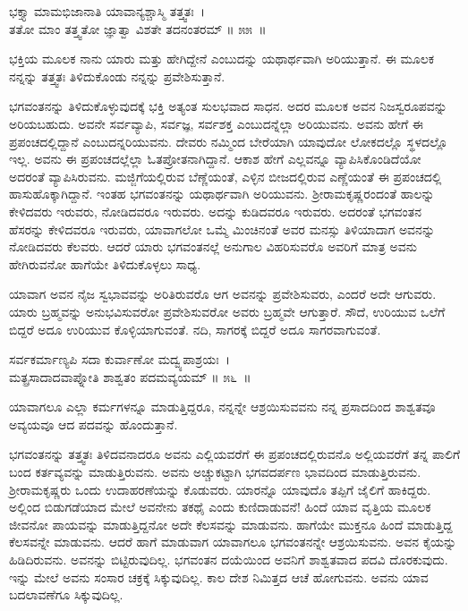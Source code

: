 \begin{shloka}
ಭಕ್ತ್ಯಾ ಮಾಮಭಿಜಾನಾತಿ ಯಾವಾನ್ಯಶ್ಚಾಸ್ಮಿ ತತ್ತ್ವತಃ~।\\ತತೋ ಮಾಂ ತತ್ತ್ವತೋ ಜ್ಞಾತ್ವಾ ವಿಶತೇ ತದನಂತರಮ್ \hfill॥ ೫೫~॥
\end{shloka}

\begin{artha}
ಭಕ್ತಿಯ ಮೂಲಕ ನಾನು ಯಾರು ಮತ್ತು ಹೇಗಿದ್ದೇನೆ ಎಂಬುದನ್ನು ಯಥಾರ್ಥವಾಗಿ ಅರಿಯುತ್ತಾನೆ. ಈ ಮೂಲಕ ನನ್ನನ್ನು ತತ್ತ್ವತಃ ತಿಳಿದುಕೊಂಡು ನನ್ನನ್ನು ಪ್ರವೇಶಿಸುತ್ತಾನೆ.
\end{artha}

ಭಗವಂತನನ್ನು ತಿಳಿದುಕೊಳ್ಳುವುದಕ್ಕೆ ಭಕ್ತಿ ಅತ್ಯಂತ ಸುಲಭವಾದ ಸಾಧನ. ಅದರ ಮೂಲಕ ಅವನ ನಿಜಸ್ವರೂಪವನ್ನು ಅರಿಯಬಹುದು. ಅವನೇ ಸರ್ವವ್ಯಾಪಿ, ಸರ್ವಜ್ಞ, ಸರ್ವಶಕ್ತ ಎಂಬುದನ್ನೆಲ್ಲಾ ಅರಿಯುವನು. ಅವನು ಹೇಗೆ ಈ ಪ್ರಪಂಚದಲ್ಲಿದ್ದಾನೆ ಎಂಬುದನ್ನರಿಯುವನು. ದೇವರು ನಮ್ಮಿಂದ ಬೇರೆಯಾಗಿ ಯಾವುದೋ ಲೋಕದಲ್ಲೊ ಸ್ಥಳದಲ್ಲೊ ಇಲ್ಲ. ಅವನು ಈ ಪ್ರಪಂಚದಲ್ಲೆಲ್ಲಾ ಓತಪ್ರೋತನಾಗಿದ್ದಾನೆ. ಆಕಾಶ ಹೇಗೆ ಎಲ್ಲವನ್ನೂ ವ್ಯಾಪಿಸಿಕೊಂಡಿದೆಯೋ ಅದರಂತೆ ವ್ಯಾಪಿಸಿರುವನು. ಮಜ್ಜಿಗೆಯಲ್ಲಿರುವ ಬೆಣ್ಣೆಯಂತೆ, ಎಳ್ಳಿನ ಬೀಜದಲ್ಲಿರುವ ಎಣ್ಣೆಯಂತೆ ಈ ಪ್ರಪಂಚದಲ್ಲಿ ಹಾಸುಹೊಕ್ಕಾಗಿದ್ದಾನೆ. ಇಂತಹ ಭಗವಂತನನ್ನು ಯಥಾರ್ಥವಾಗಿ ಅರಿಯುವನು. ಶ‍್ರೀರಾಮಕೃಷ್ಣರಂದಂತೆ ಹಾಲನ್ನು ಕೇಳಿದವರು ಇರುವರು, ನೋಡಿದವರೂ ಇರುವರು. ಅದನ್ನು ಕುಡಿದವರೂ ಇರುವರು. ಅದರಂತೆ ಭಗವಂತನ ಹೆಸರನ್ನು ಕೇಳಿದವರೂ ಇರುವರು, ಯಾವಾಗಲೋ ಒಮ್ಮೆ ಮಿಂಚಿನಂತೆ ಅವರ ಮನಸ್ಸು ತಿಳಿಯಾದಾಗ ಅವನನ್ನು ನೋಡಿದವರು ಕೆಲವರು. ಆದರೆ ಯಾರು ಭಗವಂತನಲ್ಲೆ ಅನುಗಾಲ ವಿಹರಿಸುವರೊ ಅವರಿಗೆ ಮಾತ್ರ ಅವನು ಹೇಗಿರುವನೋ ಹಾಗೆಯೇ ತಿಳಿದುಕೊಳ್ಳಲು ಸಾಧ್ಯ.

ಯಾವಾಗ ಅವನ ನೈಜ ಸ್ವಭಾವವನ್ನು ಅರಿತಿರುವರೊ ಆಗ ಅವನನ್ನು ಪ್ರವೇಶಿಸುವರು, ಎಂದರೆ ಅದೇ ಆಗುವರು. ಯಾರು ಬ್ರಹ್ಮವನ್ನು ಅನುಭವಿಸುವರೋ ಪ್ರವೇಶಿಸುವರೋ ಅವರು ಬ್ರಹ್ಮವೇ ಆಗುತ್ತಾರೆ. ಸೌದೆ, ಉರಿಯುವ ಒಲೆಗೆ ಬಿದ್ದರೆ ಅದೂ ಉರಿಯುವ ಕೊಳ್ಳಿಯಾಗುವಂತೆ. ನದಿ, ಸಾಗರಕ್ಕೆ ಬಿದ್ದರೆ ಅದೂ ಸಾಗರವಾಗುವಂತೆ.

\begin{shloka}
ಸರ್ವಕರ್ಮಾಣ್ಯಪಿ ಸದಾ ಕುರ್ವಾಣೋ ಮದ್ವ್ಯಪಾಶ್ರಯಃ~।\\ಮತ್ಪ್ರಸಾದಾದವಾಪ್ನೋತಿ ಶಾಶ್ವತಂ ಪದಮವ್ಯಯಮ್ \hfill॥ ೫೬~॥
\end{shloka}

\begin{artha}
ಯಾವಾಗಲೂ ಎಲ್ಲಾ ಕರ್ಮಗಳನ್ನೂ ಮಾಡುತ್ತಿದ್ದರೂ, ನನ್ನನ್ನೇ ಆಶ್ರಯಿಸುವವನು ನನ್ನ ಪ್ರಸಾದದಿಂದ ಶಾಶ್ವತವೂ ಅವ್ಯಯವೂ ಆದ ಪದವನ್ನು ಹೊಂದುತ್ತಾನೆ.
\end{artha}

ಭಗವಂತನನ್ನು ತತ್ತ್ವತಃ ತಿಳಿದವನಾದರೂ ಅವನು ಎಲ್ಲಿಯವರೆಗೆ ಈ ಪ್ರಪಂಚದಲ್ಲಿರುವನೊ ಅಲ್ಲಿಯವರೆಗೆ ತನ್ನ ಪಾಲಿಗೆ ಬಂದ ಕರ್ತವ್ಯವನ್ನು ಮಾಡುತ್ತಿರುವನು. ಅವನು ಅಚ್ಚುಕಟ್ಟಾಗಿ ಭಗವದರ್ಪಣ ಭಾವದಿಂದ ಮಾಡುತ್ತಿರುವನು. ಶ‍್ರೀರಾಮಕೃಷ್ಣರು ಒಂದು ಉದಾಹರಣೆಯನ್ನು ಕೊಡುವರು. ಯಾರನ್ನೊ ಯಾವುದೊ ತಪ್ಪಿಗೆ ಜೈಲಿಗೆ ಹಾಕಿದ್ದರು. ಅಲ್ಲಿಂದ ಬಿಡುಗಡೆಯಾದ ಮೇಲೆ ಅವನೇನು ತಕಥೈ ಎಂದು ಕುಣಿದಾಡುವನೆ! ಹಿಂದೆ ಯಾವ ವೃತ್ತಿಯ ಮೂಲಕ ಜೀವನೋ ಪಾಯವನ್ನು ಮಾಡುತ್ತಿದ್ದನೋ ಅದೇ ಕೆಲಸವನ್ನು ಮಾಡುವನು. ಹಾಗೆಯೇ ಮುಕ್ತನೂ ಹಿಂದೆ ಮಾಡುತ್ತಿದ್ದ ಕೆಲಸವನ್ನೇ ಮಾಡುವನು. ಆದರೆ ಹಾಗೆ ಮಾಡುವಾಗ ಯಾವಾ\-ಗಲೂ ಭಗವಂತನನ್ನೇ ಆಶ್ರಯಿಸುವನು. ಅವನ ಕೈಯನ್ನು ಹಿಡಿದಿರುವನು. ಅವನನ್ನು ಬಿಟ್ಟಿರುವುದಿಲ್ಲ. ಭಗವಂತನ ದಯೆಯಿಂದ ಅವನಿಗೆ ಶಾಶ್ವತವಾದ ಪದವಿ ದೊರಕುವುದು. ಇನ್ನು ಮೇಲೆ ಅವನು ಸಂಸಾರ ಚಕ್ರಕ್ಕೆ ಸಿಕ್ಕುವುದಿಲ್ಲ. ಕಾಲ ದೇಶ ನಿಮಿತ್ತದ ಆಚೆ ಹೋಗುವನು. ಅವನು ಯಾವ ಬದಲಾವಣೆಗೂ ಸಿಕ್ಕುವುದಿಲ್ಲ.

